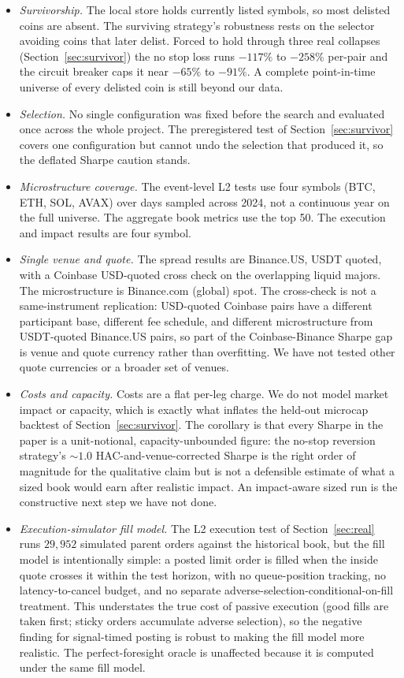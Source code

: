 \documentclass[11pt]{article}
\begin{document}
\begin{itemize}
\item \emph{Survivorship.} The local store holds currently listed symbols, so most delisted
coins are absent. The surviving strategy's robustness rests on the selector avoiding coins that
later delist. Forced to hold through three real collapses (Section~\ref{sec:survivor}) the no stop
loss runs $-117\%$ to $-258\%$ per-pair and the circuit breaker caps it near $-65\%$ to $-91\%$. A
complete point-in-time universe of every delisted coin is still beyond our data.
\item \emph{Selection.} No single configuration was fixed before the search and evaluated once
across the whole project. The preregistered test of Section~\ref{sec:survivor} covers one
configuration but cannot undo the selection that produced it, so the deflated Sharpe caution
stands.
\item \emph{Microstructure coverage.} The event-level L2 tests use four symbols (BTC, ETH,
SOL, AVAX) over days sampled across 2024, not a continuous year on the full universe. The
aggregate book metrics use the top 50. The execution and impact results are four symbol.
\item \emph{Single venue and quote.} The spread results are Binance.US, USDT quoted, with a
Coinbase USD-quoted cross check on the overlapping liquid majors. The microstructure is
Binance.com (global) spot. The cross-check is not a same-instrument replication: USD-quoted
Coinbase pairs have a different participant base, different fee schedule, and different
microstructure from USDT-quoted Binance.US pairs, so part of the Coinbase-Binance Sharpe
gap is venue and quote currency rather than overfitting. We have not tested other quote
currencies or a broader set of venues.
\item \emph{Costs and capacity.} Costs are a flat per-leg charge. We do not model market impact
or capacity, which is exactly what inflates the held-out microcap backtest of
Section~\ref{sec:survivor}. The corollary is that every Sharpe in the paper is a
unit-notional, capacity-unbounded figure: the no-stop reversion strategy's
$\sim$$1.0$ HAC-and-venue-corrected Sharpe is the right order of magnitude for the
qualitative claim but is not a defensible estimate of what a sized book would earn after
realistic impact. An impact-aware sized run is the constructive next step we have not done.

\item \emph{Execution-simulator fill model.} The L2 execution test of
Section~\ref{sec:real} runs $29{,}952$ simulated parent orders against the historical book,
but the fill model is intentionally simple: a posted limit order is filled when the inside
quote crosses it within the test horizon, with no queue-position tracking, no latency-to-cancel
budget, and no separate adverse-selection-conditional-on-fill treatment. This understates
the true cost of passive execution (good fills are taken first; sticky orders accumulate
adverse selection), so the negative finding for signal-timed posting is robust to making
the fill model more realistic. The perfect-foresight oracle is unaffected because it is
computed under the same fill model.
\end{itemize}
\end{document}
